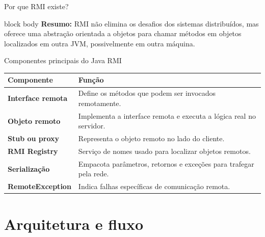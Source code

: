 \documentclass[aspectratio=169]{beamer}
\begin{document}
\begin{frame}[t]{Por que RMI existe?}
    \vspace{0.3cm}

    \begin{beamercolorbox}[
        rounded=true,
        shadow=false,
        wd=\textwidth,
        sep=0.8ex
    ]{block body}
        \scriptsize
        \textbf{Resumo:}
        RMI não elimina os desafios dos sistemas distribuídos, mas oferece uma
        abstração orientada a objetos para chamar métodos em objetos localizados
        em outra JVM, possivelmente em outra máquina.
    \end{beamercolorbox}
\end{frame}

\begin{frame}{Componentes principais do Java RMI}
    \begin{table}
        \small
        \renewcommand{\arraystretch}{1.3}
        \begin{tabular}{>{\bfseries}p{3.2cm}p{9.2cm}}
            \toprule
            Componente & Função \\
            \midrule
            Interface remota & Define os métodos que podem ser invocados remotamente. \\
            Objeto remoto & Implementa a interface remota e executa a lógica real no servidor. \\
            Stub ou proxy & Representa o objeto remoto no lado do cliente. \\
            RMI Registry & Serviço de nomes usado para localizar objetos remotos. \\
            Serialização & Empacota parâmetros, retornos e exceções para trafegar pela rede. \\
            RemoteException & Indica falhas específicas de comunicação remota. \\
            \bottomrule
        \end{tabular}
    \end{table}

\end{frame}

\section{Arquitetura e fluxo}
\end{document}
